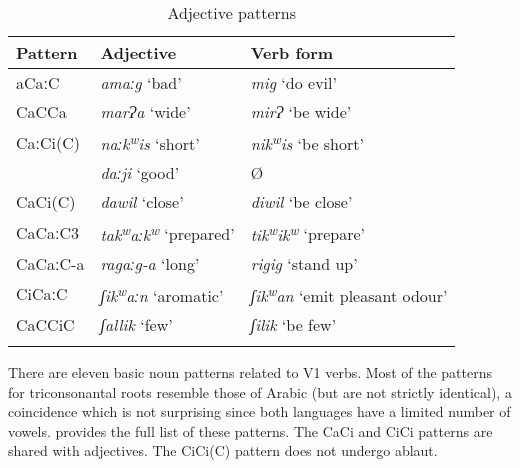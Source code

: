 \documentclass[output=paper]{langsci/langscibook}
\begin{document}
\begin{table}
\begin{tabular}{lll}
\lsptoprule
Pattern & Adjective & Verb form\\\midrule
aCaːC & \textit{amaːg} ‘bad’ & \textit{mig} ‘do evil’\\
CaCCa & \textit{marɁa} ‘wide’ & \textit{mirɁ} ‘be wide’\\
CaːCi(C) & \textit{naːk\textsuperscript{w}}\textit{is} ‘short’ & \textit{nik\textsuperscript{w}}\textit{is} ‘be short’\\
& \textit{daːji} ‘good’ & Ø\\
CaCi(C) & \textit{dawil} ‘close’ & \textit{diwil} ‘be close’\\
CaCaːC3 & \textit{tak\textsuperscript{w}}\textit{aːk\textsuperscript{w}} ‘prepared’ & \textit{tik\textsuperscript{w}}\textit{ik\textsuperscript{w}} ‘prepare’\\
CaCaːC-a & \textit{ragaːg-a} ‘long’ & \textit{rigig} ‘stand up’\\
CiCaːC & \textit{ʃik\textsuperscript{w}}\textit{aːn} ‘aromatic’ & \textit{ʃik\textsuperscript{w}}\textit{an} ‘emit pleasant odour’\\
CaCCiC & \textit{ʃallik} ‘few’ & \textit{ʃilik} ‘be few’\\
\lspbottomrule
\end{tabular} 
\caption{Adjective patterns}
\label{tab:vanhove:5}
\end{table}

There are eleven basic noun patterns related to V1 verbs. Most of the patterns for triconsonantal roots resemble those of Arabic (but are not strictly identical), a coincidence which is not surprising since both languages have a limited number of vowels.  provides the full list of these patterns. The CaCi and CiCi patterns are shared with adjectives. The CiCi(C) pattern does not undergo ablaut.
\end{document}
